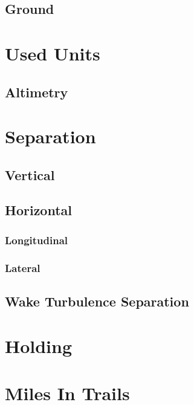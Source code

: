 \subsection{Ground}

\section{Used Units}
\subsection{Altimetry}

\section{Separation}
\subsection{Vertical}
\subsection{Horizontal}
\subsubsection{Longitudinal}
\subsubsection{Lateral}
\subsection{Wake Turbulence Separation}

\section{Holding}

\section{Miles In Trails}






